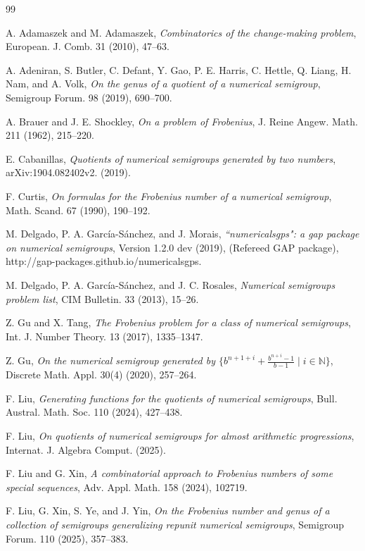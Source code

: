 \documentclass[reqno, 12pt]{article}
\theoremstyle{mydefinition}
\theoremstyle{myremark}
\numberwithin{algorithm}{section}
\begin{document}
\begin{thebibliography}{99}

 A. Adamaszek and M. Adamaszek, \emph{Combinatorics of the change-making problem}, European. J. Comb. 31 (2010), 47--63.

 A. Adeniran, S. Butler, C. Defant, Y. Gao, P. E. Harris, C. Hettle, Q. Liang, H. Nam, and A. Volk, \emph{On the genus of a quotient of a numerical semigroup}, Semigroup Forum. 98 (2019), 690--700.

 A. Brauer and J. E. Shockley, \emph{On a problem of Frobenius}, J. Reine Angew. Math. 211 (1962), 215--220.

 E. Cabanillas, \emph{Quotients of numerical semigroups generated by two numbers}, arXiv:1904.082402v2. (2019).

 F. Curtis, \emph{On formulas for the Frobenius number of a numerical semigroup}, Math. Scand. 67 (1990), 190--192.

 M. Delgado, P. A. Garc\'ia-S\'anchez, and J. Morais, \emph{``numericalsgps": a gap package on numerical semigroups}, Version 1.2.0 dev (2019), (Refereed GAP package), http://gap-packages.github.io/numericalsgps.

 M. Delgado, P. A. Garc\'ia-S\'anchez, and J. C. Rosales, \emph{Numerical semigroups problem list}, CIM Bulletin. 33 (2013), 15--26.

 Z. Gu and X. Tang, \emph{The Frobenius problem for a class of numerical semigroups}, Int. J. Number Theory. 13 (2017), 1335--1347.

 Z. Gu, \emph{On the numerical semigroup generated by $\{b^{n+1+i}+\frac{b^{n+i}-1}{b-1}\mid i\in \mathbb{N}\}$}, Discrete Math. Appl. 30(4) (2020), 257--264.

 F. Liu, \emph{Generating functions for the quotients of numerical semigroups}, Bull. Austral. Math. Soc. 110 (2024), 427--438.

 F. Liu, \emph{On quotients of numerical semigroups for almost arithmetic progressions}, Internat. J. Algebra Comput. (2025).

 F. Liu and G. Xin, \emph{A combinatorial approach to Frobenius numbers of some special sequences}, Adv. Appl. Math. 158 (2024), 102719.

 F. Liu, G. Xin, S. Ye, and J. Yin, \emph{On the Frobenius number and genus of a collection of semigroups generalizing repunit numerical semigroups}, Semigroup Forum. 110 (2025), 357--383.


\end{thebibliography}
\end{document}
